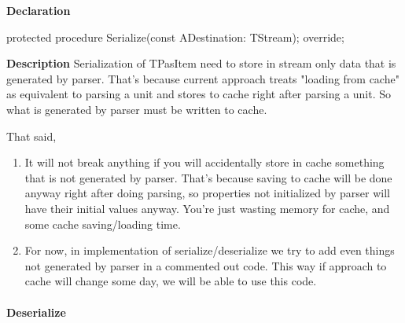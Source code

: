 \documentclass{report}
\newif\ifpdf
\begin{document}
\label{PasDoc_Items.TBaseItem-Serialize}
\begin{list}{}{
\setlength{\itemindent}{0cm}
\setlength{\listparindent}{0cm}
\setlength{\leftmargin}{\evensidemargin}
\addtolength{\leftmargin}{\tmplength}
\settowidth{\labelsep}{X}
\addtolength{\leftmargin}{\labelsep}
\setlength{\labelwidth}{\tmplength}
}
\item[\textbf{Declaration}\hfill]
\ifpdf
\begin{flushleft}
\fi
\begin{ttfamily}
protected procedure Serialize(const ADestination: TStream); override;\end{ttfamily}

\ifpdf
\end{flushleft}
\fi

\par
\item[\textbf{Description}]
Serialization of TPasItem need to store in stream only data that is generated by parser. That's because current approach treats "loading from cache" as equivalent to parsing a unit and stores to cache right after parsing a unit. So what is generated by parser must be written to cache.

That said,

\begin{enumerate}
\setcounter{enumi}{0} \setcounter{enumii}{0} \setcounter{enumiii}{0} \setcounter{enumiv}{0} 
\item  It will not break anything if you will accidentally store in cache something that is not generated by parser. That's because saving to cache will be done anyway right after doing parsing, so properties not initialized by parser will have their initial values anyway. You're just wasting memory for cache, and some cache saving/loading time.
\setcounter{enumi}{1} \setcounter{enumii}{1} \setcounter{enumiii}{1} \setcounter{enumiv}{1} 
\item  For now, in implementation of serialize/deserialize we try to add even things not generated by parser in a commented out code. This way if approach to cache will change some day, we will be able to use this code.
\end{enumerate}

\end{list}
\paragraph*{Deserialize}\hspace*{\fill}
\end{document}
